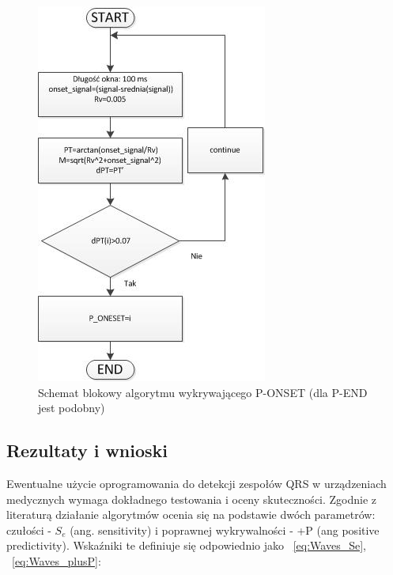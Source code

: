\begin{figure}[!h]
\centering
\includegraphics[scale=0.8] {Waves/img/schemat_P_oneset.jpg}
\caption{Schemat blokowy algorytmu wykrywającego P-ONSET (dla P-END jest podobny)  }
\label{fig:Waves_SchemPOnset}
\end{figure}

\subsection{Rezultaty i wnioski}
Ewentualne użycie oprogramowania do detekcji zespołów QRS w urządzeniach medycznych wymaga dokładnego testowania i oceny skuteczności. Zgodnie z literaturą \cite{Waves_TPoSQD} działanie algorytmów ocenia się na podstawie dwóch parametrów: czułości - $S_e$ (ang. sensitivity) i poprawnej wykrywalności - +P (ang positive predictivity). Wskaźniki te definiuje się odpowiednio jako ~\ref{eq:Waves_Se}, ~\ref{eq:Waves_plusP}:

